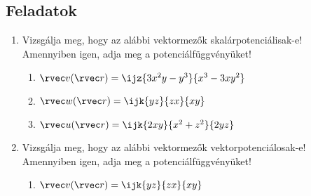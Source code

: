 \documentclass[a4paper, 12pt]{scrartcl}
\begin{document}
\clearpage
\subsection{Feladatok}

\begin{enumerate}
  \item Vizsgálja meg, hogy az alábbi vektormezők skalárpotenciálisak-e!
        Amennyiben igen, adja meg a potenciálfüggvényüket!
        \begin{enumerate}
          \item $\rvec v(\rvec r) = \ijz{3x^2y - y^3}{x^3 - 3xy^2}$
          \item $\rvec w(\rvec r) = \ijk{yz}{zx}{xy}$
          \item $\rvec u(\rvec r) = \ijk{2xy}{x^2 + z^2}{2yz}$
        \end{enumerate}

  \item Vizsgálja meg, hogy az alábbi vektormezők vektorpotenciálosak-e!
        Amennyiben igen, adja meg a potenciálfüggvényüket!
        \begin{enumerate}
          \item $\rvec v(\rvec r) = \ijk{yz}{zx}{xy}$
        \end{enumerate}

\end{enumerate}
\end{document}
